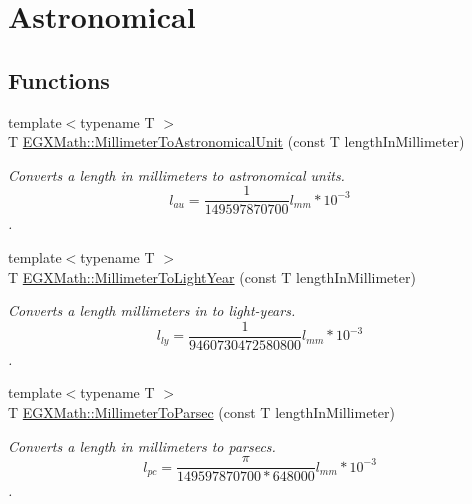 \hypertarget{group___e_g_x_math-_conversions-_length_conversions-_s_i-_millimeter-_astronomical}{}\section{Astronomical}
\label{group___e_g_x_math-_conversions-_length_conversions-_s_i-_millimeter-_astronomical}
\subsection*{Functions}
\begin{DoxyCompactItemize}
\item 
{\footnotesize template$<$typename T $>$ }\\T \mbox{\hyperlink{group___e_g_x_math-_conversions-_length_conversions-_s_i-_millimeter-_astronomical_ga1ebdde429def9d2f19771a8847f9cfb5}{E\+G\+X\+Math\+::\+Millimeter\+To\+Astronomical\+Unit}} (const T length\+In\+Millimeter)
\begin{DoxyCompactList}\small\item\em Converts a length in millimeters to astronomical units. \[ l_{au}= \frac{1}{149597870700} l_{mm} * 10^{-3} \]. \end{DoxyCompactList}\item 
{\footnotesize template$<$typename T $>$ }\\T \mbox{\hyperlink{group___e_g_x_math-_conversions-_length_conversions-_s_i-_millimeter-_astronomical_gaca60b964c53d123506847dd98ba8a00b}{E\+G\+X\+Math\+::\+Millimeter\+To\+Light\+Year}} (const T length\+In\+Millimeter)
\begin{DoxyCompactList}\small\item\em Converts a length millimeters in to light-\/years. \[ l_{ly}= \frac{1}{9460730472580800} l_{mm} * 10^{-3} \]. \end{DoxyCompactList}\item 
{\footnotesize template$<$typename T $>$ }\\T \mbox{\hyperlink{group___e_g_x_math-_conversions-_length_conversions-_s_i-_millimeter-_astronomical_ga55cf82aa51af1d469ae58cc5d03570f7}{E\+G\+X\+Math\+::\+Millimeter\+To\+Parsec}} (const T length\+In\+Millimeter)
\begin{DoxyCompactList}\small\item\em Converts a length in millimeters to parsecs. \[ l_{pc}=\frac{\pi}{149597870700 * 648000} l_{mm} * 10^{-3} \]. \end{DoxyCompactList}\end{DoxyCompactItemize}


